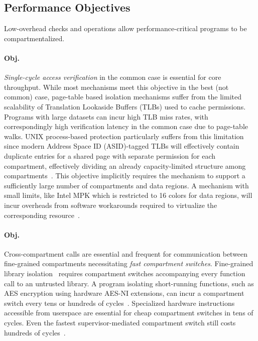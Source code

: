 \subsection{Performance Objectives}
\label{sec:reqs:performance}
Low-overhead checks and operations allow performance-critical
programs to be compartmentalized.

\paragraph{Obj. } 
\emph{Single-cycle access verification} in the common case
is essential for core throughput.
While most mechanisms meet this objective in the best (not common) case, 
page-table based isolation mechanisms suffer from the limited scalability
of Translation Lookaside Buffers (TLBs) used to cache permissions.
Programs with large datasets can incur high TLB miss rates, with 
correspondingly high verification latency in the common case due to 
page-table walks.
UNIX process-based protection particularly suffers from this limitation since
modern Address Space ID (ASID)-tagged TLBs will effectively contain duplicate
entries for a shared page with separate permission for each compartment,
effectively dividing an already capacity-limited structure among 
compartments~\cite{HsuHEP16}.
This objective implicitly requires the mechanism to support
a sufficiently large number of compartments and data regions.
A mechanism with small limits, like Intel MPK which is restricted to
16 colors for data regions, will incur overheads from software workarounds
required to virtualize the corresponding resource~\cite{ParkLXMK19}.

\paragraph{Obj. } 
Cross-compartment calls are essential and
frequent for communication between fine-grained compartments
necessitating \emph{fast compartment switches}.
Fine-grained library isolation~\cite{GhosnKPLB21} requires compartment 
switches accompanying every function call to an untrusted library.
A program isolating short-running functions, 
such as AES encryption using hardware AES-NI extensions, 
can incur a compartment switch every tens or hundreds of 
cycles~\cite{AbdAllahAES}.
Specialized hardware instructions accessible from userspace are
essential for cheap compartment switches in tens of cycles.
Even the fastest supervisor-mediated compartment switch still costs
hundreds of cycles~\cite{WatsonWNMACDDGL15}.

